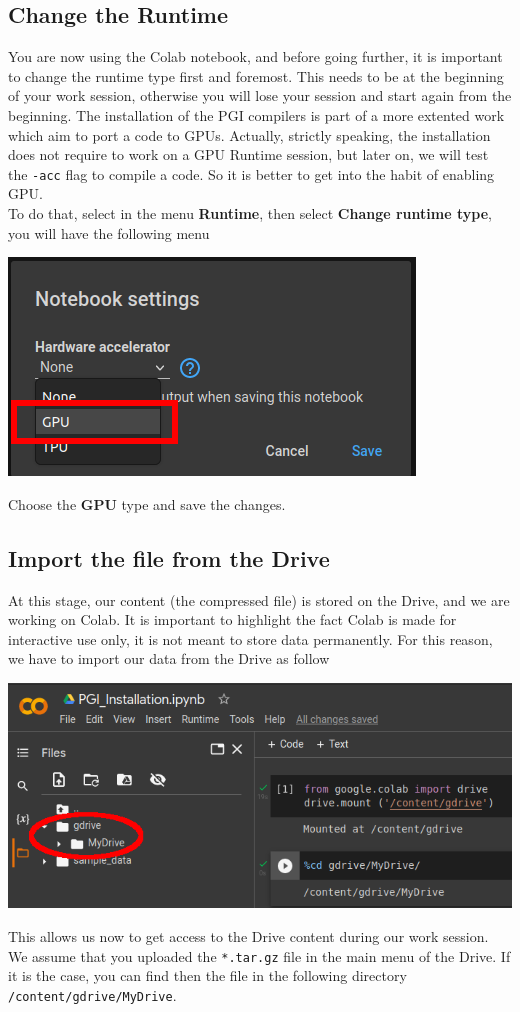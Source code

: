 \documentclass[10pt,a4paper]{article}
\newcommand{\code}[1]{\colorbox{light-gray}{\texttt{#1}}}
\begin{document}
\subsection{Change the Runtime}
You are now using the Colab notebook, and before going further, it is important to change the runtime type first and foremost. This needs to be at the beginning of your work session, otherwise you will lose your session and start again from the beginning. The installation of the PGI compilers is part of a more extented work which aim to port a code to GPUs. Actually, strictly speaking, the installation does not require to work on a GPU Runtime session, but later on, we will test the \code{-acc} flag to compile a code. So it is better to get into the habit of enabling GPU.\\
To do that, select in the menu \textbf{Runtime}, then select \textbf{Change runtime type}, you will have the following menu\\
\begin{center}
\includegraphics[scale=0.4]{gputype.png}
\end{center}
Choose the \textbf{GPU} type and save the changes.\\

\subsection{Import the file from the Drive}
At this stage, our content (the compressed file) is stored on the Drive, and we are working on Colab. It is important to highlight the fact Colab is made for interactive use only, it is not meant to store data permanently. For this reason, we have to import our data from the Drive as follow\\
\begin{center}
\includegraphics[scale=0.4]{mountdrive.png}
\end{center}
This allows us now to get access to the Drive content during our work session. We assume that you uploaded the \code{*.tar.gz} file in the main menu of the Drive. If it is the case, you can find then the file in the following directory \code{/content/gdrive/MyDrive}.
\end{document}
